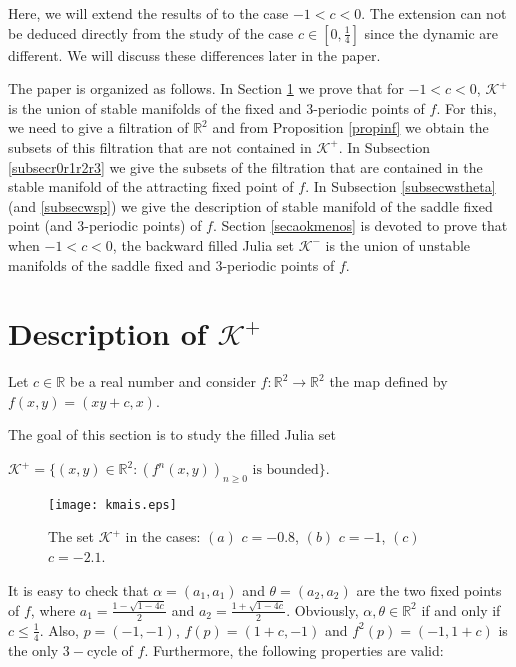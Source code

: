 \documentclass[11pt]{amsart}
\theoremstyle{definition}
\begin{document}
Here, we will extend the results of \cite{bcm} to  the case $-1< c <0$. The extension can not be deduced directly from the study of the case $c\in \left[0,\frac{1}{4}\right]$ since the dynamic are different. We will discuss these differences later in the paper.



The paper is organized as follows. In Section \ref{secaokmais} we prove that for $-1<c<0$, $\mathcal{K}^+$ is the union of stable manifolds of the fixed and $3$-periodic points of $f$. For this, we need to give a filtration of $\mathbb{R}^2$ and from Proposition \ref{propinf} we obtain the subsets of this filtration that are not contained in $\mathcal{K}^+$. In Subsection \ref{subsecr0r1r2r3} we give the subsets of the filtration that are contained in the stable manifold of the attracting fixed point of $f$. In Subsection \ref{subsecwstheta} (and \ref{subsecwsp}) we give the description of stable manifold of the saddle fixed point (and $3$-periodic points) of $f$. Section \ref{secaokmenos} is devoted to prove that when $-1<c<0$, the backward filled Julia set $\mathcal{K}^-$ is the union of unstable manifolds of the saddle fixed and $3$-periodic points of $f$.

\section{Description of $\mathcal{K}^+$}
\label{secaokmais}

Let $c\in \mathbb{R}$ be a real number and consider $f:\mathbb{R}^2\longrightarrow\mathbb{R}^2$ the map defined by $f(x,y)=(xy+c,x)$.

The goal of this section is to study the filled Julia set
\begin{center} 
	$\mathcal{K}^+=\{(x,y)\in\mathbb{R}^2:(f^n(x,y))_{n\geq 0} \textrm{ is bounded}\}$.
\end{center}
\begin{figure}[!h]
	\centering
	\texttt{[image: kmais.eps]}
	\caption{The set $\mathcal{K}^+$ in the cases: $(a)$ $c=-0.8$, $(b)$ $c=-1$, $(c)$ $c=-2.1$.} \label{kmais}
\end{figure}

It is easy to check that $\alpha=(a_1,a_1)$ and $\theta=(a_2,a_2)$ are the two fixed points of $f$, where $a_1=\frac{1-\sqrt{1-4c}}{2}$ and $a_2=\frac{1+\sqrt{1-4c}}{2}$. Obviously, $\alpha,\theta\in \mathbb{R}^2$ if and only if $c\leq \frac{1}{4}$. Also, $p=(-1,-1)$, $f(p)=(1+c,-1)$ and $f^2(p)=(-1,1+c)$ is the only $3-$cycle of $f$. Furthermore, the following properties are valid:
	
\end{document}

